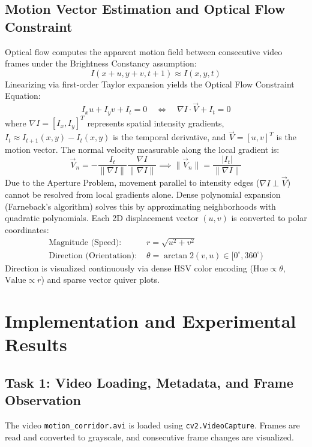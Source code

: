 \documentclass[12pt]{article}
\begin{document}
\subsection{Motion Vector Estimation and Optical Flow Constraint}
Optical flow computes the apparent motion field between consecutive video frames under the Brightness Constancy assumption:
\begin{equation}
    I(x + u, y + v, t + 1) \approx I(x, y, t)
\end{equation}
Linearizing via first-order Taylor expansion yields the Optical Flow Constraint Equation:
\begin{equation}
    I_x u + I_y v + I_t = 0 \quad \iff \quad \nabla I \cdot \vec{V} + I_t = 0
\end{equation}
where $\nabla I = [I_x, I_y]^T$ represents spatial intensity gradients, $I_t \approx I_{t+1}(x,y) - I_t(x,y)$ is the temporal derivative, and $\vec{V} = [u, v]^T$ is the motion vector. The normal velocity measurable along the local gradient is:
\begin{equation}
    \vec{V}_n = -\frac{I_t}{\|\nabla I\|}\frac{\nabla I}{\|\nabla I\|} \implies \|\vec{V}_n\| = \frac{|I_t|}{\|\nabla I\|}
\end{equation}
Due to the Aperture Problem, movement parallel to intensity edges ($\nabla I \perp \vec{V}$) cannot be resolved from local gradients alone. Dense polynomial expansion (Farneback's algorithm) solves this by approximating neighborhoods with quadratic polynomials. Each 2D displacement vector $(u, v)$ is converted to polar coordinates:
\begin{align}
    \text{Magnitude (Speed): } & r = \sqrt{u^2 + v^2} \\
    \text{Direction (Orientation): } & \theta = \arctan2(v, u) \in [0^\circ, 360^\circ)
\end{align}
Direction is visualized continuously via dense HSV color encoding ($\text{Hue} \propto \theta$, $\text{Value} \propto r$) and sparse vector quiver plots.

\section{Implementation and Experimental Results}

\subsection{Task 1: Video Loading, Metadata, and Frame Observation}
The video \texttt{motion\_corridor.avi} is loaded using \texttt{cv2.VideoCapture}. Frames are read and converted to grayscale, and consecutive frame changes are visualized.
\end{document}
